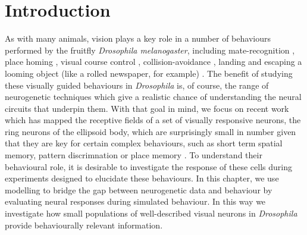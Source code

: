 \section{Introduction}
As with many animals, vision plays a key role in a number of behaviours performed by the fruitfly \emph{Drosophila melanogaster}, including mate-recognition \cite{Agrawal2014}, place homing \cite{Ofstad2011}, visual course control \cite{Borst2014}, collision-avoidance \cite{Tammero2002}, landing \cite{Tammero2002} and escaping a looming object (like a rolled newspaper, for example) \cite{Card2008}. The benefit of studying these visually guided behaviours in \emph{Drosophila} is, of course, the range of neurogenetic techniques which give a realistic chance of understanding the neural circuits that underpin them. With that goal in mind, we focus on recent work \cite{Seelig2013} which has mapped the receptive fields of a set of visually responsive neurons, the ring neurons of the ellipsoid body, which are surprisingly small in number given that they are key for certain complex behaviours, such as short term spatial memory, pattern discrimnation or place memory \cite{Liu2006,Neuser2008,Seelig2015}. To understand their behavioural role, it is desirable to investigate the response of these cells during experiments designed to elucidate these behaviours. In this chapter, we use modelling to bridge the gap between neurogenetic data and behaviour by evaluating neural responses during simulated behaviour. In this way we investigate how small populations of well-described visual neurons in \emph{Drosophila} provide behaviourally relevant information.

